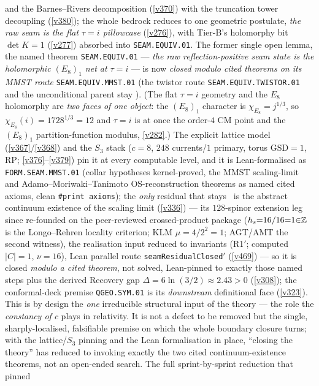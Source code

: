and the Barnes--Rivers decomposition (\vref{v370}) with the truncation tower decoupling (\vref{v380}); the whole
bedrock reduces to one geometric postulate, \emph{the raw seam is the flat $\tau{=}i$ pillowcase} (\vref{v276}), with
Tier-B's holomorphy bit $\det K{=}1$ (\vref{v277}) absorbed into \texttt{SEAM.EQUIV.01}.
The former single open lemma, the named theorem \texttt{SEAM.EQUIV.01} --- \emph{the raw reflection-positive
seam state is the holomorphic $(E_8)_1$ net at $\tau{=}i$} --- is now \emph{closed modulo cited theorems on its
MMST route} \texttt{SEAM.EQUIV.MMST.01} (the twistor route \texttt{SEAM.EQUIV.TWISTOR.01} and the unconditional
parent stay \mO). (The
flat $\tau{=}i$ geometry and the $E_8$ holomorphy are \emph{two faces of one object}: the $(E_8)_1$ character is
$\chi_{E_8}{=}j^{1/3}$, so $\chi_{E_8}(i){=}1728^{1/3}{=}12$ and $\tau{=}i$ is at once the order-$4$ CM point and the
$(E_8)_1$ partition-function modulus, \vref{v282}.) The explicit lattice model (\vref{v367}/\vref{v368}) and the
$S_3$ stack ($c{=}8$, $248$ currents/$1$ primary, torus $\mathrm{GSD}{=}1$, RP; \vref{v376}--\vref{v379}) pin it at
every computable level, and it is Lean-formalised as \texttt{FORM.SEAM.MMST.01} (collar hypotheses kernel-proved,
the MMST scaling-limit and Adamo--Moriwaki--Tanimoto OS-reconstruction theorems as named cited axioms, clean
\texttt{\#print axioms}); the \emph{only} residual that stays \mO\ is the abstract continuum existence of the scaling
limit (\vref{v336}) --- its $128$-spinor extension leg since re-founded on the peer-reviewed crossed-product package
($h_s{=}16/16{=}1{\in}\mathbb{Z}$ is the Longo--Rehren locality criterion; KLM $\mu{=}4/2^2{=}1$; AGT/AMT the second
witness), the realisation input reduced to invariants (R1$'$; computed $|C|{=}1$, $\nu{=}16$), Lean parallel route
\texttt{seamResidualClosed$'$} (\vref{v469}) --- so it is closed \emph{modulo a cited theorem},
not solved, Lean-pinned to exactly those named steps plus the derived Recovery gap
$\Delta=6\ln(3/2)\approx2.43>0$ (\vref{v308}); the conformal-deck premise
\texttt{QGEO.SYM.01} is its \emph{downstream} definitional face (\vref{v323}). This is by design the
\emph{one} irreducible structural input of the theory --- the role the \emph{constancy of $c$} plays in
relativity. It is not a defect to be removed but the single, sharply-localised, falsifiable premise on which
the whole boundary closure turns; with the lattice/$S_3$ pinning and the Lean formalisation in place,
``closing the theory'' has reduced to invoking exactly the two cited continuum-existence theorems, not an
open-ended search. The full sprint-by-sprint reduction that pinned
